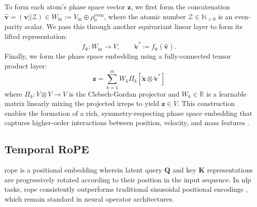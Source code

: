 To form each atom's phase space vector \(\mathbf{z}\), we first form the concatenation \(\hat{\mathbf{v}} = (\mathbf{v}||\mathcal{Z}) \in W_\text{in} := V_\text{in} \oplus \rho_0^\text{even}\), where the atomic number \(\mathcal{Z} \in \mathbb{N}_{>0}\) is an even-parity scalar. We pass this through another equivariant linear layer to form its lifted representation:
\begin{equation}
    f_{\hat{\mathbf{v}}} \colon W_\text{in} \to V,
    \qquad
    \tilde{\mathbf{v}}^* \coloneqq f_{\hat{\mathbf{v}}}(\hat{\mathbf{v}}).
\end{equation}
Finally, we form the phase space embedding using a fully-connected tensor product layer:
\begin{equation}
    \mathbf{z} = \sum_{k=1}^m W_k \Pi_k 
    [\tilde{\mathbf{x}} \otimes \tilde{\mathbf{v}}^*]
\end{equation}
where \(\Pi_k \colon V \otimes V \to V\) is the Clebsch-Gordan projector and \(W_k \in \mathbb{R}\) is a learnable matrix linearly mixing the projected irreps to yield \(\mathbf{z} \in V\). This construction enables the formation of a rich, symmetry-respecting phase space embedding that captures higher-order interactions between position, velocity, and mass features \cite{thomas_tensor_2018, fuchs_se3-transformers_2020}.

\subsection{Temporal RoPE}
\label{sec:trope}
\gls{rope} \cite{su_roformer_2023} is a positional embedding wherein latent query \(\textbf{Q}\) and key \(\textbf{K}\) representations are progressively rotated according to their position in the input sequence. In \gls{nlp} tasks, \gls{rope} consistently outperforms traditional sinusoidal positional encodings \cite{su_roformer_2023, barbero_round_2024}, which remain standard in neural operator architectures.

